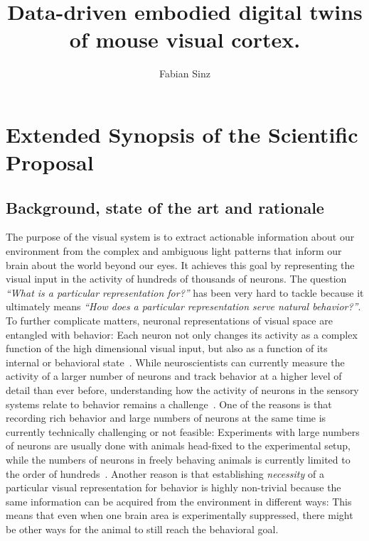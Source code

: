 \documentclass[COG,11pt]{ercgrant}
\author{Fabian Sinz}
\title{Data-driven embodied digital twins of mouse visual cortex.}
\begin{document}
\maketitle

\begin{abstract}
	\textcolor{red}{
		
	}
\end{abstract}



\section{Extended Synopsis of the Scientific Proposal}

\subsection{Background, state of the art and rationale}
The purpose of the visual system is to extract actionable information about our environment from the complex and ambiguous light patterns that inform our brain about the world beyond our eyes. 
It achieves this goal by representing the visual input in the activity of hundreds of thousands of neurons.
The question \textit{``What is a particular representation for?''} has been very hard to tackle because it ultimately means \textit{``How does a particular representation serve natural behavior?''}.
To further complicate matters, neuronal representations of visual space are entangled with behavior: Each neuron not only changes its activity as a complex function of the high dimensional visual input, but also as a function of its internal or behavioral state~\parencite{Niell2010-bs,Stringer2019-lt, Musall2019-kd, Franke2022-do}.
While neuroscientists can currently measure the activity of a larger number of neurons and track behavior at a higher level of detail than ever before, understanding how the activity of neurons in the sensory systems relate to behavior remains a challenge~\parencite{Urai2022-fz}.
One of the reasons is that recording rich behavior and large numbers of neurons at the same time is currently technically challenging or not feasible: 
Experiments with large numbers of neurons are usually done with animals head-fixed to the experimental setup, while the numbers of neurons in freely behaving animals is currently limited to the order of hundreds~\parencite{Parker2022-ac}.
Another reason is that establishing \textit{necessity} of a particular visual representation for behavior is highly non-trivial because the same information can be acquired from the environment in different ways: This means that even when one brain area is experimentally suppressed, there might be other ways for the animal to still reach the behavioral goal. 
\end{document}

